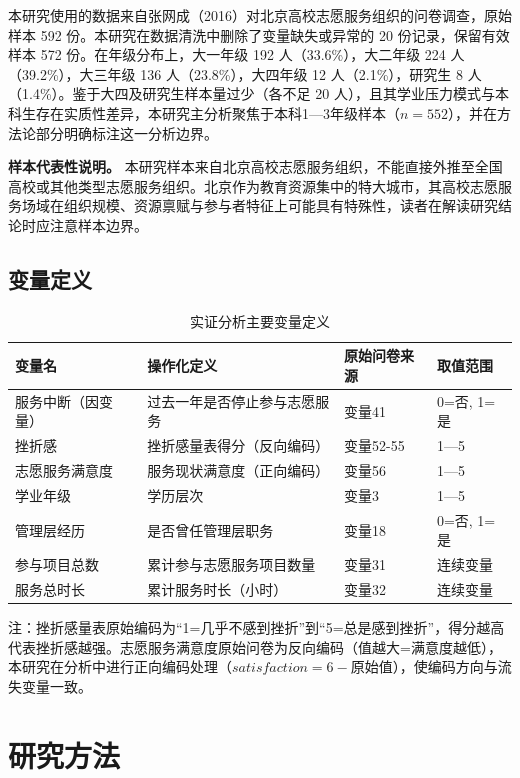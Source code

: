 \documentclass[12pt,a4paper]{article}
\begin{document}
本研究使用的数据来自张网成（2016）对北京高校志愿服务组织的问卷调查，原始样本 592 份。本研究在数据清洗中删除了变量缺失或异常的 20 份记录，保留有效样本 572 份。在年级分布上，大一年级 192 人（33.6\%），大二年级 224 人（39.2\%），大三年级 136 人（23.8\%），大四年级 12 人（2.1\%），研究生 8 人（1.4\%）。鉴于大四及研究生样本量过少（各不足 20 人），且其学业压力模式与本科生存在实质性差异，本研究主分析聚焦于本科1—3年级样本（$n = 552$），并在方法论部分明确标注这一分析边界。

\textbf{样本代表性说明。} 本研究样本来自北京高校志愿服务组织，不能直接外推至全国高校或其他类型志愿服务组织。北京作为教育资源集中的特大城市，其高校志愿服务场域在组织规模、资源禀赋与参与者特征上可能具有特殊性，读者在解读研究结论时应注意样本边界。

\subsection{变量定义}

\begin{table}[H]
\centering
\caption{实证分析主要变量定义}
\label{tab:var_def}
\begin{tabular}{p{3cm}p{4cm}p{3.5cm}p{2cm}}
\toprule
变量名 & 操作化定义 & 原始问卷来源 & 取值范围 \\
\midrule
服务中断（因变量） & 过去一年是否停止参与志愿服务 & 变量41 & 0=否, 1=是 \\
挫折感 & 挫折感量表得分（反向编码） & 变量52-55 & 1—5 \\
志愿服务满意度 & 服务现状满意度（正向编码） & 变量56 & 1—5 \\
学业年级 & 学历层次 & 变量3 & 1—5 \\
管理层经历 & 是否曾任管理层职务 & 变量18 & 0=否, 1=是 \\
参与项目总数 & 累计参与志愿服务项目数量 & 变量31 & 连续变量 \\
服务总时长 & 累计服务时长（小时） & 变量32 & 连续变量 \\
\bottomrule
\end{tabular}
\end{table}

注：挫折感量表原始编码为“1=几乎不感到挫折”到“5=总是感到挫折”，得分越高代表挫折感越强。志愿服务满意度原始问卷为反向编码（值越大=满意度越低），本研究在分析中进行正向编码处理（$satisfaction = 6 - 原始值$），使编码方向与流失变量一致。

\section{研究方法}
\end{document}
